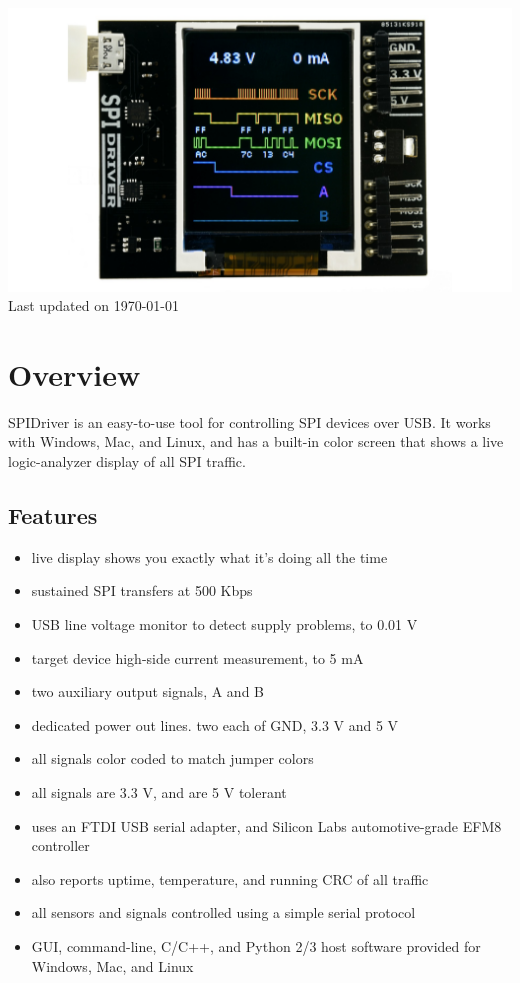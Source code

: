 \documentclass{article}
\begin{document}
\newpage
\begin{center}
\includegraphics[width=1.00\textwidth]{img/spidriver/main}
Last updated on \today
\end{center}
\tableofcontents

\newpage

\setlength{\parindent}{0mm}
\setlength{\parskip}{1mm}

\section{Overview}

SPIDriver is an easy-to-use tool for controlling SPI devices over USB.
It works with Windows, Mac, and Linux, and has a built-in color screen that shows a live logic-analyzer display of all SPI traffic.

\subsection{Features}
\begin{itemize}
\item live display shows you exactly what it’s doing all the time
\item sustained SPI transfers at 500 Kbps
\item USB line voltage monitor to detect supply problems, to 0.01 V
\item target device high-side current measurement, to 5 mA
\item two auxiliary output signals, A and B
\item dedicated power out lines. two each of GND, 3.3 V and 5 V
\item all signals color coded to match jumper colors
\item all signals are 3.3 V, and are 5 V tolerant
\item uses an FTDI USB serial adapter, and Silicon Labs automotive-grade EFM8 controller
\item also reports uptime, temperature, and running CRC of all traffic
\item all sensors and signals controlled using a simple serial protocol
\item GUI, command-line, C/C++, and Python 2/3 host software provided for Windows, Mac, and Linux
\end{itemize}
\end{document}
